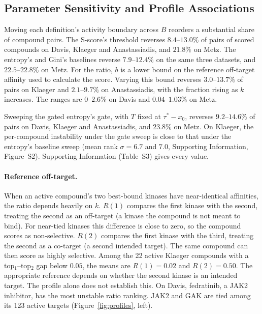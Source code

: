 \subsection{Parameter Sensitivity and Profile Associations}
\label{sec:results:instability}

Moving each definition's activity boundary across $B$ reorders a substantial
share of compound pairs. The S-score's threshold reverses $8.4$--$13.0\%$ of
pairs of scored compounds on Davis, Klaeger and Anastassiadis, and $21.8\%$ on
Metz. The entropy's and Gini's baselines reverse $7.9$--$12.4\%$ on the same three
datasets, and $22.5$--$22.8\%$ on Metz. For the ratio, $b$ is a lower bound
on the reference off-target affinity used to calculate the score. Varying
this bound reverses $3.0$--$13.7\%$ of pairs on Klaeger and $2.1$--$9.7\%$ on
Anastassiadis, with the fraction rising as $k$ increases. The ranges are
$0$--$2.6\%$ on Davis and $0.04$--$1.03\%$ on Metz.

Sweeping the gated entropy's gate, with $T$ fixed at $\tau^* - x_0$, reverses
$9.2$--$14.6\%$ of pairs on Davis, Klaeger and Anastassiadis, and $23.8\%$ on
Metz. On Klaeger, the per-compound instability under the gate sweep is close
to that under the entropy's baseline sweep (mean rank $\sigma = 6.7$ and
$7.0$, Supporting Information, Figure~S2).
Supporting Information (Table~S3) gives every value.

\paragraph{Reference off-target.} When an active compound's two best-bound
kinases have near-identical affinities, the ratio depends heavily on $k$.
$R(1)$ compares the first kinase with the second, treating the second as an
off-target (a kinase the compound is not meant to bind). For near-tied kinases
this difference is close to zero, so the compound scores as non-selective.
$R(2)$ compares the first kinase with the third, treating the second as a
co-target (a second intended target). The same compound can then score as
highly selective. Among the 22 active Klaeger compounds with a top$_1$--top$_2$
gap below $0.05$, the means are $R(1) = 0.02$ and $R(2) = 0.50$.
The appropriate reference depends on whether the second kinase is an
intended target. The profile alone does not establish this. On Davis,
fedratinib, a JAK2 inhibitor, has the most unstable ratio ranking. JAK2 and
GAK are tied among its 123 active targets (Figure~\ref{fig:profiles}, left).

